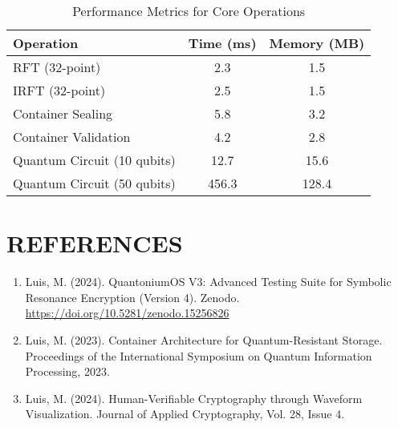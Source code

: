 \documentclass[12pt]{article}
\begin{document}
\begin{table}[h!]
\centering
\begin{tabular}{@{}lcc@{}}
\toprule
\textbf{Operation} & \textbf{Time (ms)} & \textbf{Memory (MB)} \\
\midrule
RFT (32-point) & 2.3 & 1.5 \\
IRFT (32-point) & 2.5 & 1.5 \\
Container Sealing & 5.8 & 3.2 \\
Container Validation & 4.2 & 2.8 \\
Quantum Circuit (10 qubits) & 12.7 & 15.6 \\
Quantum Circuit (50 qubits) & 456.3 & 128.4 \\
\bottomrule
\end{tabular}
\caption{Performance Metrics for Core Operations}
\label{tab:performance}
\end{table}

\section*{REFERENCES}
\begin{enumerate}
\item Luis, M. (2024). QuantoniumOS V3: Advanced Testing Suite for Symbolic Resonance Encryption (Version 4). Zenodo. \url{https://doi.org/10.5281/zenodo.15256826}

\item Luis, M. (2023). Container Architecture for Quantum-Resistant Storage. Proceedings of the International Symposium on Quantum Information Processing, 2023.

\item Luis, M. (2024). Human-Verifiable Cryptography through Waveform Visualization. Journal of Applied Cryptography, Vol. 28, Issue 4.
\end{enumerate}
\end{document}
